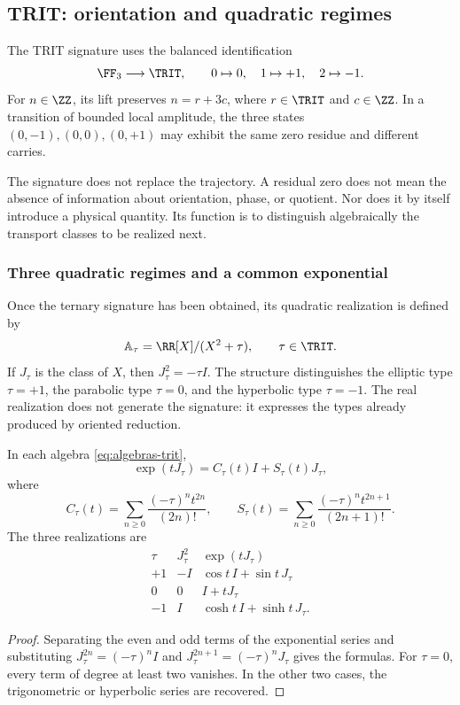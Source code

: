 \subsection{TRIT: orientation and quadratic regimes}

\begin{definition}
The TRIT signature uses the balanced identification
\[
 \FF_3\longrightarrow\TRIT,\qquad 0\mapsto0,\quad1\mapsto+1,\quad2\mapsto-1.
\]
For \(n\in\ZZ\), its lift preserves \(n=r+3c\), where \(r\in\TRIT\) and \(c\in\ZZ\). In a transition of bounded local amplitude, the three states \((0,-1),(0,0),(0,+1)\) may exhibit the same zero residue and different carries.
\end{definition}

The signature does not replace the trajectory. A residual zero does not mean the absence of information about orientation, phase, or quotient. Nor does it by itself introduce a physical quantity. Its function is to distinguish algebraically the transport classes to be realized next.

\subsubsection{Three quadratic regimes and a common exponential}

Once the ternary signature has been obtained, its quadratic realization is defined by
\begin{equation}
 \mathbb A_\tau=\RR[X]/(X^2+\tau),\qquad \tau\in\TRIT.
 \label{eq:algebras-trit}
\end{equation}
If \(J_\tau\) is the class of \(X\), then \(J_\tau^2=-\tau I\). The structure distinguishes the elliptic type \(\tau=+1\), the parabolic type \(\tau=0\), and the hyperbolic type \(\tau=-1\). The real realization does not generate the signature: it expresses the types already produced by oriented reduction.

\begin{proposition}
In each algebra \eqref{eq:algebras-trit},
\begin{equation}
 \exp(tJ_\tau)=C_\tau(t)I+S_\tau(t)J_\tau,
\end{equation}
where
\[
 C_\tau(t)=\sum_{n\ge0}\frac{(-\tau)^nt^{2n}}{(2n)!},\qquad
 S_\tau(t)=\sum_{n\ge0}\frac{(-\tau)^nt^{2n+1}}{(2n+1)!}.
\]
The three realizations are
\[
 \begin{array}{c|c|c}
 \tau&J_\tau^2&\exp(tJ_\tau)\\\hline
 +1&-I&\cos t\,I+\sin t\,J_\tau\\
 0&0&I+tJ_\tau\\
 -1&I&\cosh t\,I+\sinh t\,J_\tau.
 \end{array}
\]
\end{proposition}
\begin{proof}
Separating the even and odd terms of the exponential series and substituting \(J_\tau^{2n}=(-\tau)^nI\) and \(J_\tau^{2n+1}=(-\tau)^nJ_\tau\) gives the formulas. For \(\tau=0\), every term of degree at least two vanishes. In the other two cases, the trigonometric or hyperbolic series are recovered.
\end{proof}

